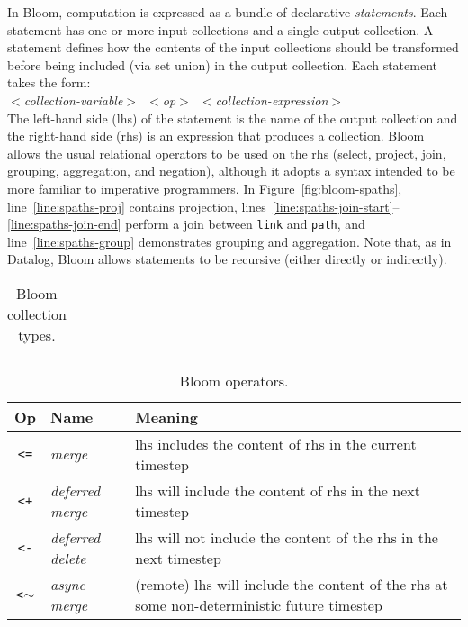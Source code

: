In Bloom, computation is expressed as a bundle of declarative
\emph{statements}. Each statement has one or more input collections and a single
output collection. A statement defines how the contents of the input
collections should be transformed before being included (via set union) in the
output collection. Each statement takes the form: \\ \noindent
\mbox{\hspace{0.25in}\emph{$<$collection-variable$>$ $<$op$>$
    $<$collection-expression$>$}}\\ \noindent
The left-hand side (lhs) of the statement is the name of the output collection
and the right-hand side (rhs) is an expression that produces a collection. Bloom
allows the usual relational operators to be used on the rhs (select, project,
join, grouping, aggregation, and negation), although it adopts a syntax intended
to be more familiar to imperative programmers. In Figure~\ref{fig:bloom-spaths},
line~\ref{line:spaths-proj} contains projection,
lines~\ref{line:spaths-join-start}--\ref{line:spaths-join-end} perform a join
between \texttt{link} and \texttt{path}, and line~\ref{line:spaths-group}
demonstrates grouping and aggregation. Note that, as in Datalog, Bloom allows
statements to be recursive (either directly or
indirectly). %

\begin{table}
\begin{tabular}{|c|l|}
\end{tabular}
\caption{Bloom collection types.}
\label{tbl:bloom-collections}
\end{table}

\begin{table}
\begin{tabular}{|c|l|p{1.85in}|}
\hline
\textbf{Op} & \textbf{Name} & \textbf{Meaning} \\
\hline
\verb|<=| & \emph{merge} & lhs includes the content of rhs in the
current timestep \\
\hline
\verb|<+| & \emph{deferred merge} & lhs will include the content of rhs in the
next timestep \\
\hline
\verb|<-| & \emph{deferred delete} & lhs will not include the content of the rhs
in the next timestep \\
\hline
\verb|<|$\sim$ & \emph{async merge} & (remote) lhs will include the content of the
rhs at some non-deterministic future timestep\\
\hline
\end{tabular}
\caption{Bloom operators.}
\label{tbl:bloom-ops}
\end{table}

